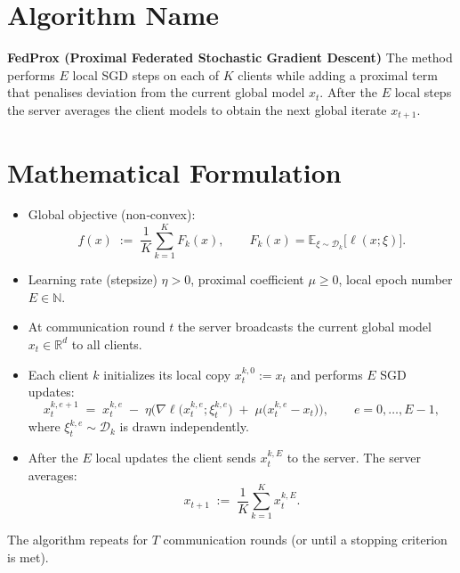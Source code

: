 \documentclass[11pt]{article}
\begin{document}
\section*{Algorithm Name}
\textbf{FedProx (Proximal Federated Stochastic Gradient Descent)}  
The method performs $E$ local SGD steps on each of $K$ clients while
adding a proximal term that penalises deviation from the current global
model $x_t$. After the $E$ local steps the server averages the client
models to obtain the next global iterate $x_{t+1}$.

\section*{Mathematical Formulation}
\begin{itemize}
  \item Global objective (non‑convex):
  \[
    f(x)\;:=\;\frac1K\sum_{k=1}^{K}F_k(x),\qquad 
    F_k(x)=\mathbb{E}_{\xi\sim\mathcal{D}_k}\big[\ell(x;\xi)\big].
  \]
  \item Learning rate (stepsize) $\eta>0$, proximal coefficient $\mu\ge 0$,
  local epoch number $E\in\mathbb{N}$.
  \item At communication round $t$ the server broadcasts the current
  global model $x_t\in\mathbb{R}^d$ to all clients.
  \item Each client $k$ initializes its local copy
  $x^{k,0}_t:=x_t$ and performs $E$ SGD updates:
  \[
  \boxed{
  x^{k,e+1}_t \;=\; x^{k,e}_t 
          \;-\;\eta\Big(\nabla\ell\big(x^{k,e}_t;\xi^{k,e}_t\big)
          \;+\;\mu\big(x^{k,e}_t-x_t\big)\Big),\qquad e=0,\dots,E-1,
  }
  \]
  where $\xi^{k,e}_t\sim\mathcal{D}_k$ is drawn independently.
  \item After the $E$ local updates the client sends $x^{k,E}_t$ to the
  server.  The server averages:
  \[
    x_{t+1}\;:=\;\frac1K\sum_{k=1}^{K}x^{k,E}_t .
  \]
\end{itemize}
The algorithm repeats for $T$ communication rounds (or until a stopping
criterion is met).

\end{document}
